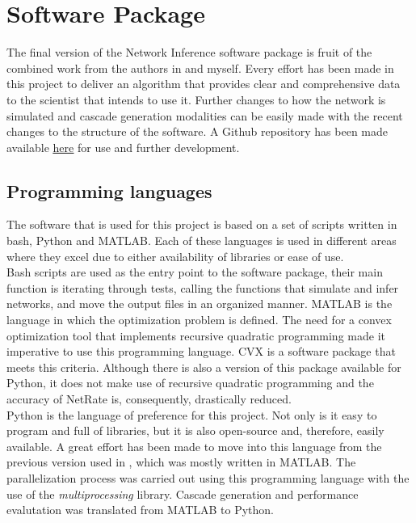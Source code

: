 
\chapter{Software Package}

The final version of the Network Inference software package is fruit of the combined work from the authors in \cite{alexandru2018estimating} and myself. Every effort has been made in this project to deliver an algorithm that provides clear and comprehensive data to the scientist that intends to use it. Further changes to how the network is simulated and cascade generation modalities can be easily made with the recent changes to the structure of the software. A Github repository has been made available \href{https://github.com/gilson15/Network-Inference}{\underline{here}} for use and further development. 

\section{Programming languages}

The software that is used for this project is based on a set of scripts written in bash, Python and MATLAB. Each of these languages is used in different areas where they excel due to either availability of libraries or ease of use. \\

Bash scripts are used as the entry point to the software package, their main function is iterating through tests, calling the functions that simulate and infer networks, and move the output files in an organized manner.
MATLAB is the language in which the optimization problem is defined. The need for a convex optimization tool that implements recursive quadratic programming made it imperative to use this programming language. CVX is a software package that meets this criteria. Although there is also a version of this package available for Python, it does not make use of recursive quadratic programming and the accuracy of NetRate is, consequently, drastically reduced.\\

Python is the language of preference for this project. Not only is it easy to program and full of libraries, but it is also open-source and, therefore, easily available. A great effort has been made to move into this language from the previous version used in \cite{alexandru2018estimating}, which was mostly written in MATLAB. 
The parallelization process was carried out using this programming language with the use of the \textit{multiprocessing} library. Cascade generation and performance evalutation was translated from MATLAB to Python.\\

